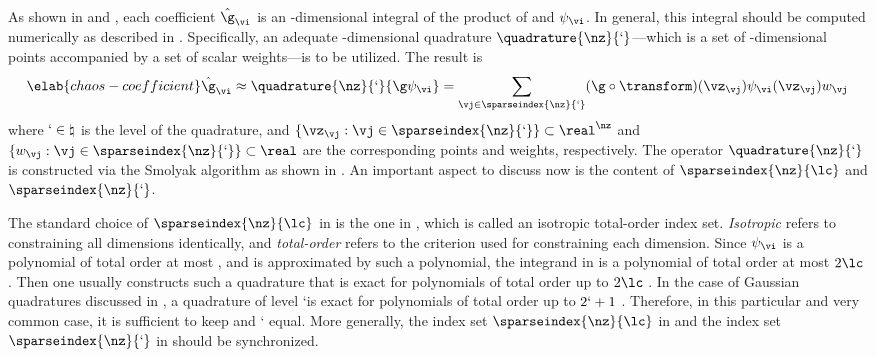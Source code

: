 As shown in  and , each
coefficient $\hat{\g}_{\vi}$ is an \nz-dimensional integral of the product of \g
and $\psi_{\vi}$. In general, this integral should be computed numerically as
described in . Specifically, an adequate
\nz-dimensional quadrature $\quadrature{\nz}{\lq}$---which is a set of
\nz-dimensional points accompanied by a set of scalar weights---is to be
utilized. The result is
\begin{equation} \elab{chaos-coefficient}
  \hat{\g}_{\vi} \approx \quadrature{\nz}{\lq}{\g \psi_{\vi}}
  = \sum_{\vj \in \sparseindex{\nz}{\lq}} (\g \circ \transform)(\vz_{\vj}) \psi_{\vi}(\vz_{\vj}) w_{\vj}
\end{equation}
where $\lq \in \natural$ is the level of the quadrature, and $\{ \vz_{\vj}: \vj
\in \sparseindex{\nz}{\lq} \} \subset \real^\nz$ and $\{ w_{\vj}: \vj \in
\sparseindex{\nz}{\lq}  \} \subset \real$ are the corresponding points and
weights, respectively. The operator $\quadrature{\nz}{\lq}$ is constructed via
the Smolyak algorithm \cite{smolyak1963} as shown in .
An important aspect to discuss now is the content of $\sparseindex{\nz}{\lc}$
and $\sparseindex{\nz}{\lq}$.

The standard choice of $\sparseindex{\nz}{\lc}$ in  is the
one in , which is called an isotropic
total-order index set. \emph{Isotropic} refers to constraining all dimensions
identically, and \emph{total-order} refers to the criterion used for
constraining each dimension. Since $\psi_{\vi}$ is a polynomial of total order
at most \lc, and \g is approximated by such a polynomial, the integrand in
 is a polynomial of total order at most $2 \lc$. Then
one usually constructs such a quadrature that is exact for polynomials of total
order up to $2 \lc$ \cite{eldred2008}. In the case of Gaussian quadratures
discussed in , a quadrature of level \lq is exact for
polynomials of total order up to $2 \lq + 1$ \cite{heiss2008}. Therefore, in
this particular and very common case, it is sufficient to keep \lc and \lq
equal. More generally, the index set $\sparseindex{\nz}{\lc}$ in
 and the index set $\sparseindex{\nz}{\lq}$ in
 should be synchronized.

